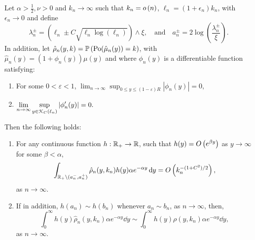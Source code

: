 \begin{lemma}\label{lem:concentration_argument_rho_approximation}
Let $\alpha > \frac{1}{2}, \nu > 0$ and $k_n \to \infty$ such that $k_n = o\left(n\right)$, $\ell_n = (1 + \epsilon_n)k_n$, with $\epsilon_n \to 0$ and define
\[
	\lambda_n^\pm = (\ell_n \pm C \sqrt{\ell_n \log(\ell_n)}) \wedge \xi, \quad \text{and} \quad a_n^\pm = 2 \log\left(\frac{\lambda_n^\pm}{\xi}\right).
\] 
In addition, let $\hat{\rho}_n(y,k) = \mathbb{P}\left({\mathrm{Po}}(\hat{\mu}_n(y)) = k\right)$, with $\hat{\mu}_n(y) = (1 + \phi_n(y))\mu(y)$ and 
where $\phi_n(y)$ is a differentiable function satisfying:
\begin{enumerate}[\upshape i)]
\item For some $0 < \varepsilon < 1$, $\displaystyle \lim_{n \to \infty} \sup_{0 \le y \le (1 - \varepsilon)R} |\phi_n(y)| = 0$,
\item $\displaystyle \lim_{n \to \infty}  \sup_{y \in {\mathcal K}_{C}(\ell_n)} |\phi_n^\prime(y)| = 0.$
\end{enumerate}
Then the following holds:
\begin{enumerate}
\item For any continuous function $h : {\mathbb R}_+ \rightarrow  {\ensuremath{\mathbb R}}$, such that $h(y) = O\left(e^{\beta y}\right)$ as $y \to \infty$ for some $\beta < \alpha$, 
\begin{equation}\label{eq:error_bound_int_rho_approx_not_K}
	\int_{{\mathbb R}_+ \setminus (a_n^-, a_n^+)} \hat{\rho}_n(y,k_n) h(y) \alpha e^{-\alpha y} \operatorname{\mathrm{d}\hspace{-2pt}} y
	= O\left(k_n^{-(1+C^2)/2}\right),
\end{equation}
as $n \to \infty$.
\item If in addition, $h(a_n) \sim h(b_n)$ whenever $a_n \sim b_n$, as $n \to \infty$, then,
\begin{equation}\label{eq:concentration_h_rho_approx}
	\int_0^\infty h(y) \hat{\rho}_n(y,k_n) \alpha e^{-\alpha y} \dd y \sim  
		\int_0^\infty h(y) \rho(y,k_n) \alpha e^{-\alpha y} \dd y,
\end{equation}
as $n \to \infty$.
\end{enumerate}
\end{lemma}

